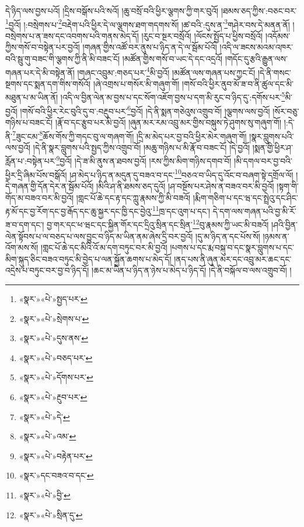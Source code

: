 དེ་ཉིད་ལས་བྱས་པའོ། །དྲིས་བསྒོས་པའི་སའོ། །ཆུ་བསྲོ་བའི་ཕྱིར་ལྕགས་ཀྱི་གར་བུའོ། །ཐམས་ཅད་ཀྱིས་:བཅང་བར་\footnote{«སྣར་»«པེ་»སྤྱད་པར་}བྱའོ། །:བསྲེགས་པ་\footnote{«སྣར་»«པེ་»སྲེགས་པ་}བརྡེག་པའི་ཕྱིར་དེ་ལ་ལྕགས་ཐག་གདགས་སོ། །ཚ་བའི་:དུས་ན་\footnote{«སྣར་»«པེ་»དུས་ནས་}གཤེར་བས་དེ་མནན་ནོ། །བསྲེགས་པ་ན་ཟས་དང་འབགས་པའི་གནས་མེད་དོ། །རུང་བ་སྔར་བསྲོའོ། །ལོངས་སྤྱོད་པ་ཕྱིས་བསྲོའོ། །འདོམས་ཀྱིས་གསོ་བ་བསྟེན་པར་བྱའོ། །གཞན་གྱིས་འཚོ་བར་ནུས་པ་ཉིད་ན་དེ་ལ་སྦོམ་པོའོ། །འདི་ལ་ཟངས་མའམ་འཁར་བའི་སྦུ་གུ་བཟང་གི་ལྕགས་ཀྱི་ནི་མི་བཟང་ངོ། །མཚོན་གྱིས་གསོ་བ་ཡང་དེ་དང་འདྲའོ། །གདོང་དུ་རྩའི་རྒྱུན་ལས་གཞན་པར་དེ་མི་བསྟེན་ནོ། །གཞང་འབྲུམ་:གཅད་པར་\footnote{«སྣར་»«པེ་»བཅད་པར་}མི་བྱའོ། །མཚོན་ལས་གཞན་པས་ཀྱང་ངོ། །དེ་ནི་གསང་སྔགས་དང་སྨན་དག་གིས་གསོའོ། །ཞེ་འགྲས་པ་གསོར་མི་གཞུག་གོ། །གསོ་བའི་ཕྱིར་ནུབ་མོ་ཟ་བ་ནི་ཚུལ་དང་མི་མཐུན་པ་མ་ཡིན་ནོ། །འདི་ལ་བྱིན་ལེན་མ་བྱས་པ་དང་སོག་འཇོག་བྱས་པ་དག་མི་རུང་བ་ཉིད་དུ་:དགོས་པར་\footnote{«སྣར་»«པེ་»དོགས་པར་}མི་བྱའོ། །གསོ་བའི་ཕྱིར་རེང་བུའི་དུ་བ་:བརྔུབ་པར་\footnote{«སྣར་»«པེ་»རྔུབ་པར་}བྱའོ། །དེ་ནི་སྨན་གཅེའུས་འགྲུབ་བོ། །ལྕགས་ལས་བྱའོ། །སོར་བཅུ་གཉིས་པ་བཟང་ངོ། །རྣོ་བ་དང་རྩུབ་པར་མི་བྱའོ། །ཞུན་མར་རམ་འབྲུ་མར་གྱིས་བསྐུས་ཏེ་ཤུགས་སུ་གཞུག་གོ། །:དེ་ནི་\footnote{«སྣར་»«པེ་»དེ་}ཟུང་ངམ་\footnote{«སྣར་»«པེ་»འམ་}ཆོས་གོས་ཀྱི་གདང་བུ་ལ་གཞག་གོ། །དྲི་མ་མེད་པར་བྱ་བའི་ཕྱིར་མེར་གཞུག་གོ། །སྣར་བླུགས་པའི་ལས་བྱའོ། །དེ་ནི་སྣར་བླུགས་པའི་སྤྱད་ཀྱིས་འགྲུབ་བོ། །མཆུ་གཉིས་པ་མི་རྣོ་བ་བཟང་ངོ། །དེ་བྱའོ། །སྨན་གྱི་ཕྱིར་ཤ་རློན་པ་:བསྟེན་པར་\footnote{«སྣར་»«པེ་»བརྟེན་པར་}བྱའོ། །དེ་ཟ་མི་ནུས་ན་ཐབས་བྱའོ། །རས་ཀྱིས་མིག་གཉིས་དགབ་བོ། །མི་དགལ་བར་བྱ་བའི་ཕྱིར་དྲི་ཞིམ་པོས་བསྒོའོ། །ཤ་མེད་པ་ཉིད་ན་མདུན་དུ་བཟའ་བ་དང་\footnote{«སྣར་»དང་བཟའ་བ་དང་}བཅའ་བ་ཡིད་དུ་འོང་བ་བཞག་སྟེ་དགྲོལ་ལོ། །དེ་གཞན་གྱི་དོན་དེར་ན་སྦོམ་པོའོ། །མིའི་ཤ་ནི་ཐམས་ཅད་དུའོ། །ཤ་བསྔོས་པར་ཤེས་ན་བཟའ་བར་མི་བྱའོ། །སྟག་གི་གོད་མ་བཟའ་བར་མི་བྱའོ། །གླང་པོ་ཆེ་དང་རྟ་དང་ཀླུ་རྣམས་ཀྱི་མི་བཟའོ། །རྨིག་གཅིག་པ་དང་ཝ་དང་སྤྲེའུ་དང་ཤིང་རྟ་མོ་དང་བྱ་རོག་དང་བྱ་རྒོད་དང་ཆུ་སྐྱར་དང་ཁྱི་དང་བྱེའུ་\footnote{«སྣར་»«པེ་»བྱི་}ཁྲ་དང་འུག་པ་དང་། དེ་དག་ལས་གཞན་པའི་བྱ་མི་རོ་ཟ་བ་དག་དང་། བྱ་གར་དང་ཕ་ཝང་དང་སྐྱིན་གོར་དང་དྲིའུ་སྲིན་དང་སྲིན་\footnote{«སྣར་»«པེ་»སྲིན་དུ་}བུ་རྣམས་ཀྱི་ཡང་མི་བཟའོ། །ཤའི་བྱིན་ལེན་སྟོབས་པ་ལ་བཅད་པ་ལས་བྱུང་བ་ཉིད་མ་ཡིན་ནམ་ཞེས་དྲི་བར་བྱའོ། །དུ་མ་ཉིད་ན་དང་པོས་སོ། །ཉམས་ན་འོག་མས་སོ། །གླང་པོ་ཆེ་དང་མིའི་འོ་མ་དག་བཏུང་བར་མི་བྱའོ། །པགས་པ་དང་རྨ་བསྐུ་བ་དང་སྣར་བླུགས་པ་དང་མིག་སྐུད་ཅིང་བཟའ་བཏུང་མི་བྱེད་པ་ལན་སྐྱོན་ཆགས་པ་མེད་དོ། །ནད་པས་ནི་ཞུན་མར་དང་འབྲུ་མར་ཆང་དང་འདྲེས་པ་བཏུང་བར་བྱ་བ་ཉིད་དོ། །ཆང་མ་ཡིན་པ་ཉིད་ན་ཉེས་པ་མེད་པ་ཉིད་དོ། །དེ་ནི་བསྐོལ་བ་ལས་འགྲུབ་བོ། །
